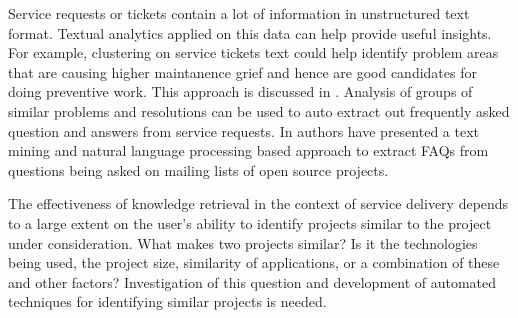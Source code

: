 Service requests or tickets contain a lot of information in unstructured text format. Textual analytics applied on this data can help provide useful insights. For example, clustering on service tickets text could help identify problem areas that are causing higher maintanence grief and hence are good candidates for doing preventive work. This approach is discussed in \cite{mani2014}. Analysis of groups of similar problems and resolutions can be used to auto extract out frequently asked question and answers from service requests. In \cite{henss12} authors have presented a text mining and natural language processing based approach to extract FAQs from questions being asked on mailing lists of open source projects.

The effectiveness of knowledge retrieval in the context of service delivery
depends to a large extent on the user's ability to identify projects similar to
the project under consideration. What makes two projects similar? Is it the
technologies being used, the project size, similarity of applications, or a
combination of these and other factors? Investigation of this question and
development of automated techniques for identifying similar projects is needed.


